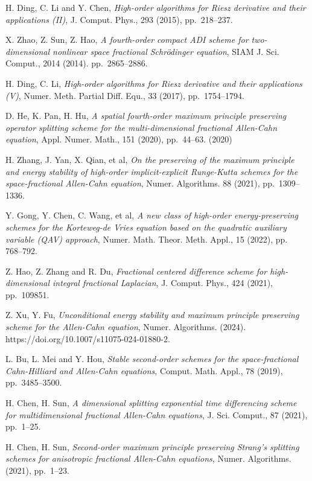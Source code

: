 \documentclass{siamart171218}
\numberwithin{theorem}{section}
\numberwithin{equation}{section}
\begin{document}
\begin{thebibliography}{99}
{\sc H. Ding, C. Li and Y. Chen}, {\em High-order algorithms for Riesz derivative
 and their applications (II)}, J. Comput. Phys., 293 (2015), pp.~218--237.


{\sc X. Zhao, Z. Sun, Z. Hao}, {\em A fourth-order compact ADI scheme
for two-dimensional nonlinear space fractional
Schr\"{o}dinger equation}, SIAM J. Sci.
Comput., 2014 (2014). pp.~2865--2886.

{\sc H. Ding, C. Li}, {\em High-order algorithms
 for Riesz derivative and their applications (V)}, Numer. Meth.
  Partial Diff. Equ., 33 (2017), pp.~1754--1794.


{\sc D. He, K. Pan, H. Hu}, {\em A spatial fourth-order maximum principle
preserving operator splitting
scheme for the multi-dimensional fractional Allen-Cahn equation},
 Appl. Numer. Math., 151 (2020), pp.~44--63.
(2020)

{\sc H. Zhang, J. Yan, X. Qian, et al}, {\em On the preserving of the maximum principle and energy stability
of high-order implicit-explicit Runge-Kutta schemes for the space-fractional Allen-Cahn equation},
Numer. Algorithms. 88 (2021), pp.~1309--1336.

{\sc Y. Gong, Y. Chen, C. Wang, et al}, {\em A new class of high-order energy-preserving schemes for the
Korteweg-de Vries equation based on the quadratic auxiliary variable (QAV) approach}, Numer. Math.
Theor. Meth. Appl., 15 (2022), pp.~ 768--792.

{\sc Z. Hao, Z. Zhang and R. Du}, {\em Fractional centered difference scheme for
high-dimensional integral fractional
Laplacian}, J. Comput. Phys., 424 (2021), pp.~109851.

{\sc Z. Xu, Y. Fu}, {\em Unconditional energy stability and maximum principle
preserving scheme for the Allen-Cahn equation},
Numer. Algorithms. (2024). https://doi.org/10.1007/s11075-024-01880-2.

{\sc L. Bu, L. Mei and Y. Hou}, {\em Stable second-order schemes for the
space-fractional Cahn-Hilliard and
Allen-Cahn equations}, Comput. Math. Appl., 78 (2019), pp.~3485--3500.

{\sc  H. Chen, H. Sun}, {\em A dimensional splitting exponential time
differencing scheme for multidimensional
fractional Allen-Cahn equations}, J. Sci. Comput., 87 (2021), pp.~1--25.

{\sc  H. Chen, H. Sun}, {\em Second-order maximum principle preserving
Strang's splitting schemes for anisotropic
fractional Allen-Cahn equations}, Numer. Algorithms.  (2021), pp.~1--23.




\end{thebibliography}
\end{document}
